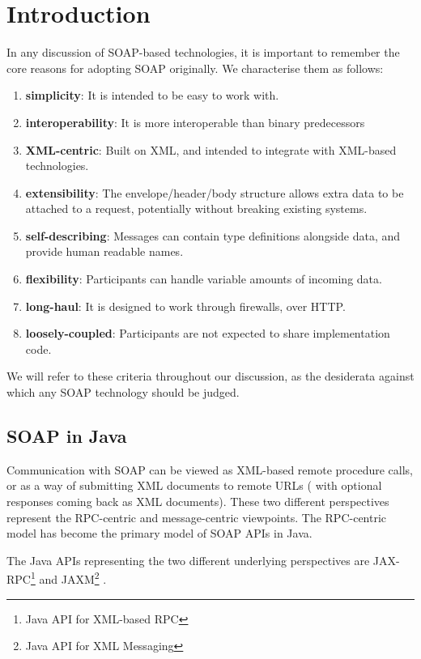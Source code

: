 \section{Introduction}
\label{introduction}

In any discussion of SOAP-based technologies, it is important to
remember the core reasons for adopting SOAP originally. We
characterise them as follows:

\begin{enumerate}
\item \textbf{simplicity}: It is intended to be easy to work with.
\item \textbf{interoperability}: It is more interoperable than binary predecessors
\item \textbf{XML-centric}: Built on XML, and intended to integrate
with XML-based technologies.
\item \textbf{extensibility}: The envelope/header/body structure allows extra data to be attached to a
request, potentially without breaking existing systems.
\item \textbf{self-describing}: Messages can contain type definitions alongside
data, and provide human readable names.
\item \textbf{flexibility}: Participants can handle variable amounts of
incoming data.
\item \textbf{long-haul}: It is designed to work through firewalls, over HTTP.
\item \textbf{loosely-coupled}: Participants are not expected to share
implementation code.
\end{enumerate}

We will refer to these criteria throughout our discussion, as the
desiderata against which any SOAP technology should be judged.

\subsection{SOAP in Java}
\label{intro:java}

Communication with SOAP can be viewed as XML-based remote procedure
calls, or as a way of submitting XML documents to remote URLs ( with
optional responses coming back as XML documents). These two different
perspectives represent the RPC-centric and message-centric
viewpoints. The RPC-centric model has become the primary
model of SOAP APIs in Java.

The Java APIs representing the two different underlying perspectives
are JAX-RPC\footnote{Java API for XML-based RPC}
\cite{spec:JAX-RPC-11} and JAXM\footnote{Java API for XML Messaging}
\cite{spec:JAX-M-11}. 


